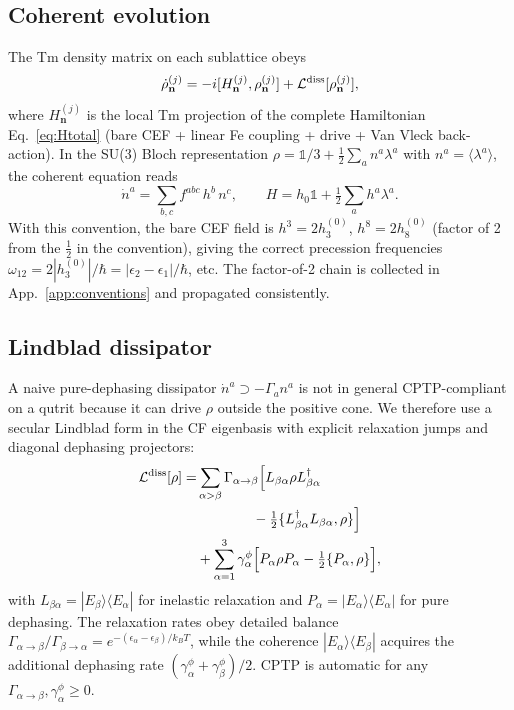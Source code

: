 \documentclass[reprint,amsmath,amssymb,aps,prb,longbibliography]{revtex4-2}
\newcommand{\fix}[1]{#1}
\newcommand{\half}{\tfrac{1}{2}}
\begin{document}
\subsection{Coherent evolution}
The Tm density matrix on each sublattice obeys
\begin{equation}
\dot\rho^{(j)}_{\mathbf n} = -i[H^{(j)}_{\mathbf n}, \rho^{(j)}_{\mathbf n}] + \mathcal L^{\rm diss}[\rho^{(j)}_{\mathbf n}],
\label{eq:rhoEOM}
\end{equation}
where $H^{(j)}_{\mathbf n}$ is the local Tm projection of the complete
Hamiltonian Eq.~\eqref{eq:Htotal} (bare CEF + linear Fe coupling + drive
+ Van Vleck back-action). In the SU(3) Bloch
representation $\rho = \mathds{1}/3 + \half\sum_a n^a\lambda^a$ with
$n^a = \langle\lambda^a\rangle$, the coherent equation reads
\begin{equation}
\dot n^a = \sum_{b,c} f^{abc}\,h^b\,n^c,\qquad
H = h_0\mathds{1} + \half\sum_a h^a\lambda^a.
\label{eq:nEOM}
\end{equation}
With this convention, the bare CEF field is $h^3 = 2 h^{(0)}_3$, $h^8 =
2 h^{(0)}_8$ (factor of 2 from the $\half$ in the convention), giving the
correct precession frequencies $\omega_{12} = 2|h^{(0)}_3|/\hbar
= |\epsilon_2-\epsilon_1|/\hbar$, etc. \fix{The factor-of-2 chain is
collected in App.~\ref{app:conventions} and propagated consistently.}

\subsection{Lindblad dissipator}
A naive pure-dephasing dissipator $\dot n^a\supset -\Gamma_a n^a$ is not
in general CPTP-compliant on a qutrit because it can drive $\rho$ outside
the positive cone. We therefore use a secular Lindblad form in the CF
eigenbasis with explicit relaxation jumps and diagonal dephasing
projectors:
\begin{equation}
\begin{aligned}
\mathcal L^{\rm diss}[\rho] = &\sum_{\alpha>\beta}\Gamma_{\alpha\to\beta}\Bigl[
L_{\beta\alpha}\rho L_{\beta\alpha}^\dagger\\
&\qquad\qquad{} - \half\{L_{\beta\alpha}^\dagger L_{\beta\alpha}, \rho\}
\Bigr]\\
&{} + \sum_{\alpha=1}^3\gamma^\phi_{\alpha}\Bigl[
P_{\alpha}\rho P_{\alpha} - \half\{P_{\alpha}, \rho\}
\Bigr],
\end{aligned}
\label{eq:Lindblad}
\end{equation}
with $L_{\beta\alpha} = |E_\beta\rangle\langle E_\alpha|$ for inelastic
relaxation and $P_{\alpha}=|E_\alpha\rangle\langle E_\alpha|$ for pure
dephasing. The relaxation rates obey detailed balance
$\Gamma_{\alpha\to\beta}/\Gamma_{\beta\to\alpha} =
e^{-(\epsilon_\alpha-\epsilon_\beta)/k_BT}$, while the coherence
$|E_\alpha\rangle\langle E_\beta|$ acquires the additional dephasing rate
$(\gamma^\phi_{\alpha}+\gamma^\phi_{\beta})/2$. CPTP is automatic for any
$\Gamma_{\alpha\to\beta}, \gamma^\phi_{\alpha}\geq 0$.
\end{document}
